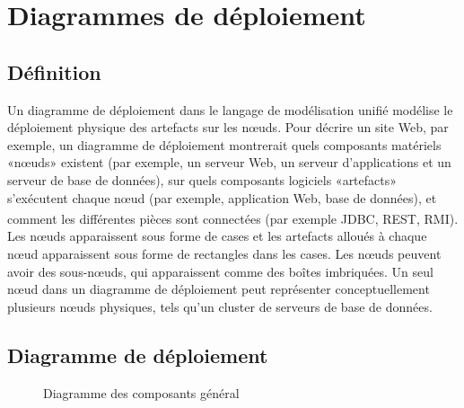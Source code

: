 \documentclass[12pt]{report}
\begin{document}
\newpage

\section{Diagrammes de déploiement}
\subsection{Définition}
\hspace*{0.16in}
Un diagramme de déploiement dans le langage de modélisation unifié modélise le déploiement physique des artefacts sur les nœuds. Pour décrire un site Web, par exemple, un diagramme de déploiement montrerait quels composants matériels «nœuds» existent (par exemple, un serveur Web, un serveur d’applications et un serveur de base de données), sur quels composants logiciels «artefacts» s’exécutent chaque nœud (par exemple, application Web, base de données), et comment les différentes pièces sont connectées (par exemple JDBC, REST, RMI). \textsuperscript{\cite{booch2005unified}}
\\
\hspace*{0.16in}
Les nœuds apparaissent sous forme de cases et les artefacts alloués à chaque nœud apparaissent sous forme de rectangles dans les cases. Les nœuds peuvent avoir des sous-nœuds, qui apparaissent comme des boîtes imbriquées. Un seul nœud dans un diagramme de déploiement peut représenter conceptuellement plusieurs nœuds physiques, tels qu’un cluster de serveurs de base de données.

\subsection{Diagramme de déploiement}

\begin{figure}[h]
\centering
    \centerline{}
    \caption{Diagramme des composants général}
\end{figure}
\end{document}
